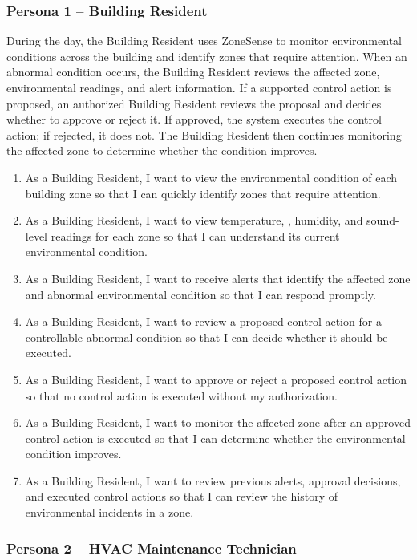\documentclass[11pt,a4paper]{article}
\begin{document}
\subsubsection*{Persona 1 -- Building Resident}

During the day, the Building Resident uses ZoneSense to monitor environmental conditions across the building and identify zones that require attention. When an abnormal condition occurs, the Building Resident reviews the affected zone, environmental readings, and alert information. If a supported control action is proposed, an authorized Building Resident reviews the proposal and decides whether to approve or reject it. If approved, the system executes the control action; if rejected, it does not. The Building Resident then continues monitoring the affected zone to determine whether the condition improves.

\begin{enumerate}[itemsep=3pt]
\item As a Building Resident, I want to view the environmental condition of each building zone so that I can quickly identify zones that require attention.
\item As a Building Resident, I want to view temperature, \COtwo, humidity, and sound-level readings for each zone so that I can understand its current environmental condition.
\item As a Building Resident, I want to receive alerts that identify the affected zone and abnormal environmental condition so that I can respond promptly.
\item As a Building Resident, I want to review a proposed control action for a controllable abnormal condition so that I can decide whether it should be executed.
\item As a Building Resident, I want to approve or reject a proposed control action so that no control action is executed without my authorization.
\item As a Building Resident, I want to monitor the affected zone after an approved control action is executed so that I can determine whether the environmental condition improves.
\item As a Building Resident, I want to review previous alerts, approval decisions, and executed control actions so that I can review the history of environmental incidents in a zone.
\end{enumerate}

\subsubsection*{Persona 2 -- HVAC Maintenance Technician}
\end{document}
